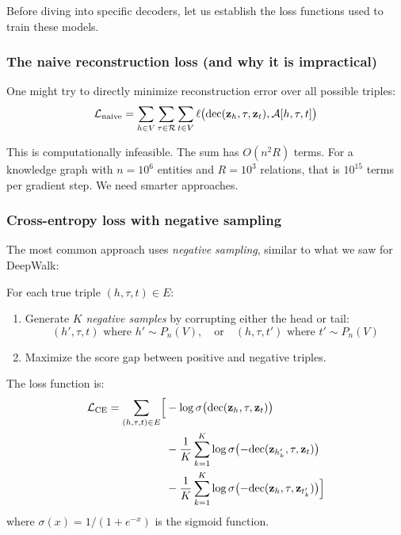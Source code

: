 \begin{notechapter}
Before diving into specific decoders, let us establish the loss functions used to train these models.

\subsubsection*{The naive reconstruction loss (and why it is impractical)}

One might try to directly minimize reconstruction error over all possible triples:
\[
\mathcal{L}_{\text{naive}} = \sum_{h \in V} \sum_{\tau \in \mathcal{R}} \sum_{t \in V} \ell\bigl(\text{dec}(\mathbf{z}_h, \tau, \mathbf{z}_t), \mathcal{A}[h, \tau, t]\bigr)
\]

\begin{intuition}[Motivation]
This is computationally infeasible. The sum has $O(n^2 R)$ terms. For a knowledge graph with $n = 10^6$ entities and $R = 10^3$ relations, that is $10^{15}$ terms per gradient step. We need smarter approaches.
\end{intuition}

\subsubsection*{Cross-entropy loss with negative sampling}

The most common approach uses \emph{negative sampling}, similar to what we saw for DeepWalk:

\begin{definition}
For each true triple $(h, \tau, t) \in E$:
\begin{enumerate}
    \item Generate $K$ \emph{negative samples} by corrupting either the head or tail:
    \[
    (h', \tau, t) \text{ where } h' \sim P_n(V), \quad \text{or} \quad (h, \tau, t') \text{ where } t' \sim P_n(V)
    \]
    \item Maximize the score gap between positive and negative triples.
\end{enumerate}

The loss function is:
\begin{align}
\mathcal{L}_{\text{CE}} = \sum_{(h,\tau,t) \in E} \Bigl[
&-\log \sigma\bigl(\text{dec}(\mathbf{z}_h, \tau, \mathbf{z}_t)\bigr) \nonumber \\
&- \frac{1}{K}\sum_{k=1}^{K} \log \sigma\bigl(-\text{dec}(\mathbf{z}_{h_k'}, \tau, \mathbf{z}_t)\bigr) \nonumber \\
&- \frac{1}{K}\sum_{k=1}^{K} \log \sigma\bigl(-\text{dec}(\mathbf{z}_h, \tau, \mathbf{z}_{t_k'})\bigr)
\Bigr]
\end{align}
where $\sigma(x) = 1/(1+e^{-x})$ is the sigmoid function.
\end{definition}


\end{notechapter}
